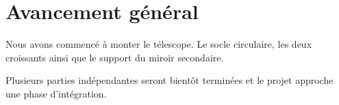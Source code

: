\chapter{Avancement général}

Nous avons commencé à monter le télescope. Le socle circulaire, les deux croissants ainsi que le support du miroir secondaire.

\vspace{1cm}

Plusieurs parties indépendantes seront bientôt terminées et le projet approche une phase d'intégration.


